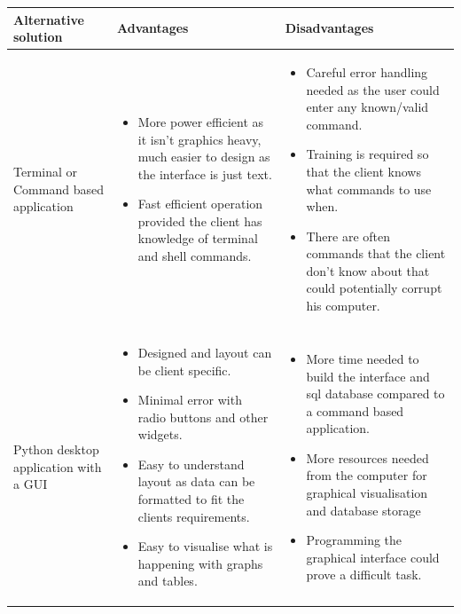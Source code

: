 \begin{center}
    \begin{tabular}{|p{3cm}|p{6cm}|p{6cm}|}
        \hline
        \textbf{Alternative solution} & \textbf{Advantages} & \textbf{Disadvantages}\\ \hline            
        Terminal or Command based application & \begin{itemize} \item More power efficient as it isn't graphics heavy, much easier to design as the interface is just text. \item Fast efficient operation provided the client has knowledge of terminal and shell commands. \end{itemize} & \begin{itemize} \item Careful error handling needed as the user could enter any known/valid command. \item Training is required so that the client knows what commands to use when. \item There are often commands that the client don't know about that could potentially corrupt his computer. \end{itemize}\\ \hline
        Python desktop application with a GUI & \begin{itemize} \item Designed and layout can be client specific. \item Minimal error with radio buttons and other widgets. \item Easy to understand layout as data can be formatted to fit the clients requirements. \item Easy to visualise what is happening with graphs and tables. \end{itemize} & \begin{itemize} \item More time needed to build the interface and sql database compared to a command based application. \item More resources needed from the computer for graphical visualisation and database storage \item Programming the graphical interface could prove a difficult task. \end{itemize}\\ \hline
    \end{tabular}
\end{center}

\newpage

